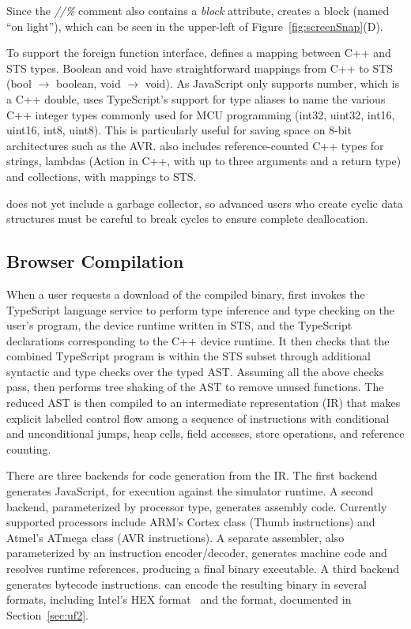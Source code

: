 Since the \emph{//\%} comment also contains a \emph{block} attribute, \MC creates a block (named ``on light''), which can be seen in the upper-left of Figure~\ref{fig:screenSnap}(D).

To support the foreign function interface, \MC defines a mapping between C++ and STS types.
Boolean and void have straightforward mappings from C++ to STS (bool $\rightarrow$ boolean, void $\rightarrow$ void).
As JavaScript only supports number, which is a C++ double, \MC uses TypeScript's support
for type aliases to name the various C++ integer types commonly used for MCU programming
(int32, uint32, int16, uint16, int8, uint8).
This is particularly useful for saving space on 8-bit architectures such as the AVR.
\MC also includes reference-counted C++ types for strings, lambdas (Action in C++, with
up to three arguments and a return type) and collections, with mappings to STS.

\MC does not yet include a garbage collector, so advanced users who create cyclic
data structures must be careful to break cycles to ensure complete deallocation.

\subsection{Browser Compilation}

When a user requests a download of the compiled binary, \MC first invokes the TypeScript language service to perform type inference and type checking on the
user's program, the device runtime written in STS, and the TypeScript declarations
corresponding to the C++ device runtime. It then checks that the
combined TypeScript program is within the STS subset through additional syntactic and type checks over the typed AST.  Assuming all the
above checks pass, \MC then performs tree shaking of the AST to remove unused functions.
The reduced AST is then compiled to an intermediate representation (IR) that makes explicit labelled control
flow among a sequence of instructions with conditional and unconditional jumps, heap cells, field accesses, store operations, and reference counting.

There are three backends for code generation from the IR. The first backend generates JavaScript, for execution against the simulator runtime.  A second backend, parameterized by processor type, generates assembly code. Currently supported processors include ARM's Cortex class (Thumb instructions) and Atmel's ATmega class (AVR instructions). A separate assembler, also parameterized by an instruction encoder/decoder, generates machine code and resolves runtime references, producing a final binary executable. A third backend generates bytecode instructions. \MC can encode the resulting binary in several formats, including Intel's HEX format~\cite{IntelHEX} and the \UF format, documented in Section~\ref{sec:uf2}.

